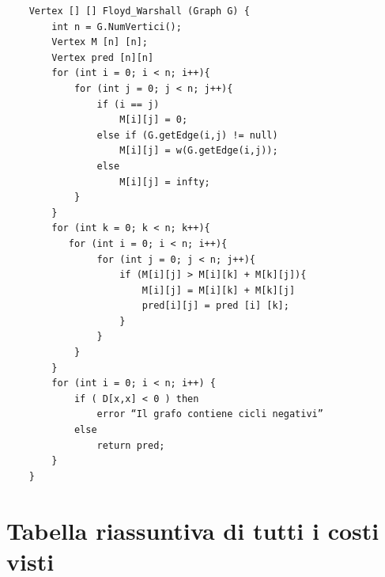 \documentclass{article}
\begin{document}
\begin{verbatim}
    Vertex [] [] Floyd_Warshall (Graph G) {
        int n = G.NumVertici();
        Vertex M [n] [n];
        Vertex pred [n][n]
        for (int i = 0; i < n; i++){
            for (int j = 0; j < n; j++){
                if (i == j)
                    M[i][j] = 0;
                else if (G.getEdge(i,j) != null)
                    M[i][j] = w(G.getEdge(i,j));
                else
                    M[i][j] = infty;
            }
        }
        for (int k = 0; k < n; k++){
           for (int i = 0; i < n; i++){
                for (int j = 0; j < n; j++){
                    if (M[i][j] > M[i][k] + M[k][j]){
                        M[i][j] = M[i][k] + M[k][j]
                        pred[i][j] = pred [i] [k];
                    }
                }
            } 
        }
        for (int i = 0; i < n; i++) {
            if ( D[x,x] < 0 ) then
                error “Il grafo contiene cicli negativi”
            else
                return pred;
        }
    }
\end{verbatim}



\section{Tabella riassuntiva di tutti i costi visti}
\end{document}

